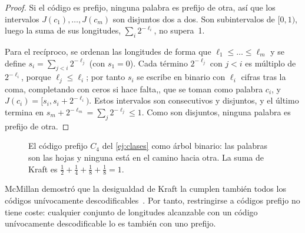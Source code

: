\begin{proof}
Si el código es prefijo, ninguna palabra es prefijo de otra, así que los intervalos $J(c_1),\dots,J(c_m)$ son disjuntos dos a dos. Son subintervalos de $[0,1)$, luego la suma de sus longitudes, $\sum_i2^{-\ell_i}$, no supera~1.

Para el recíproco, se ordenan las longitudes de forma que $\ell_1\le\dots\le\ell_m$ y se define $s_i=\sum_{j<i}2^{-\ell_j}$ (con $s_1=0$). Cada término $2^{-\ell_j}$ con $j<i$ es múltiplo de $2^{-\ell_i}$, porque $\ell_j\le\ell_i$; por tanto $s_i$ se escribe en binario con $\ell_i$ cifras tras la coma, completando con ceros si hace falta,, que se toman como palabra $c_i$, y $J(c_i)=[s_i,s_i+2^{-\ell_i})$. Estos intervalos son consecutivos y disjuntos, y el último termina en $s_m+2^{-\ell_m}=\sum_j2^{-\ell_j}\le 1$. Como son disjuntos, ninguna palabra es prefijo de otra.
\end{proof}

\begin{figure}[h]
\centering
{}
\caption{El código prefijo $C_4$ del \cref{ej:clases} como árbol binario: las palabras son las hojas y ninguna está en el camino hacia otra. La suma de Kraft es $\tfrac12+\tfrac14+\tfrac18+\tfrac18=1$.}
\label{fig:arbol-kraft}
\end{figure}

\begin{observacion}
McMillan demostró que la desigualdad de Kraft la cumplen también todos los códigos unívocamente descodificables~\cite[§5.5]{ct}. Por tanto, restringirse a códigos prefijo no tiene coste: cualquier conjunto de longitudes alcanzable con un código unívocamente descodificable lo es también con uno prefijo.
\end{observacion}

